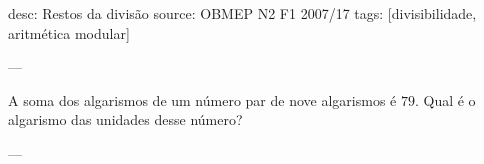 desc:  Restos da divisão
source:  OBMEP N2 F1 2007/17
tags:  [divisibilidade, aritmética modular]

---

A soma dos algarismos de um número par de nove algarismos é $79$. Qual é o algarismo das unidades desse número?

---
